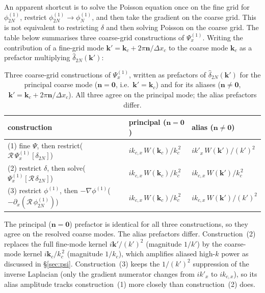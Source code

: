 \documentclass[12pt]{article}
\newcommand{\R}{\mathcal{R}}
\begin{document}
An apparent shortcut is to solve the Poisson equation once on the
fine grid for $\phi^{(1)}_{2N}$, restrict $\phi^{(1)}_{2N}\to\phi^{(1)}_N$,
and then take the gradient on the coarse grid. This is not equivalent
to restricting $\delta$ and then solving Poisson on the coarse grid.
The table below summarises three coarse-grid constructions of $\Psi_x^{(1)}$.
Writing the contribution of a fine-grid mode $\mathbf k'=\mathbf k_c +
2\pi\mathbf n/\Delta x_c$ to the coarse mode $\mathbf k_c$ as a
prefactor multiplying $\hat\delta_{2N}(\mathbf k')$:
\begin{table}[h]
\centering
\begin{tabular}{lll}
\hline
construction & principal ($\mathbf n=\mathbf 0$) & alias ($\mathbf n\ne\mathbf 0$) \\
\hline
(1) fine $\Psi$, then restrict\quad ($\R\,\Psi^{(1)}_x[\delta_{2N}]$)
   & $i k_{c,x}\,W(\mathbf k_c)/k_c^{\,2}$
   & $i k'_x\,W(\mathbf k')/(k')^{2}$ \\
(2) restrict $\delta$, then solve\quad ($\Psi^{(1)}_x[\R\,\delta_{2N}]$)
   & $i k_{c,x}\,W(\mathbf k_c)/k_c^{\,2}$
   & $i k_{c,x}\,W(\mathbf k')/k_c^{\,2}$ \\
(3) restrict $\phi^{(1)}$, then $-\nabla\phi^{(1)}$\quad ($-\partial_x(\R\,\phi^{(1)}_{2N})$)
   & $i k_{c,x}\,W(\mathbf k_c)/k_c^{\,2}$
   & $i k_{c,x}\,W(\mathbf k')/(k')^{2}$ \\
\hline
\end{tabular}
\caption{Three coarse-grid constructions of $\Psi_x^{(1)}$, written as
prefactors of $\hat\delta_{2N}(\mathbf k')$ for the principal coarse
mode ($\mathbf n=\mathbf 0$, i.e.\ $\mathbf k'=\mathbf k_c$) and for
its aliases ($\mathbf n\ne\mathbf 0$, $\mathbf k'=\mathbf k_c+2\pi\mathbf
n/\Delta x_c$). All three agree on the principal mode; the alias
prefactors differ.}
\label{tab:constructions}
\end{table}
The principal ($\mathbf n=\mathbf 0$) prefactor is identical for all
three constructions, so they agree on the resolved coarse modes. The
alias prefactors differ. Construction~(2) replaces the full
fine-mode kernel $i\mathbf k'/(k')^{2}$ (magnitude $1/k'$) by the
coarse-mode kernel $i\mathbf k_c/k_c^{\,2}$ (magnitude $1/k_c$), which
amplifies aliased high-$k$ power as discussed in \S\ref{sec:psi}.
Construction~(3) keeps the $1/(k')^{2}$ suppression of the inverse
Laplacian (only the gradient numerator changes from $ik'_x$ to
$ik_{c,x}$), so its alias amplitude tracks construction~(1) more
closely than construction~(2) does.
\end{document}
